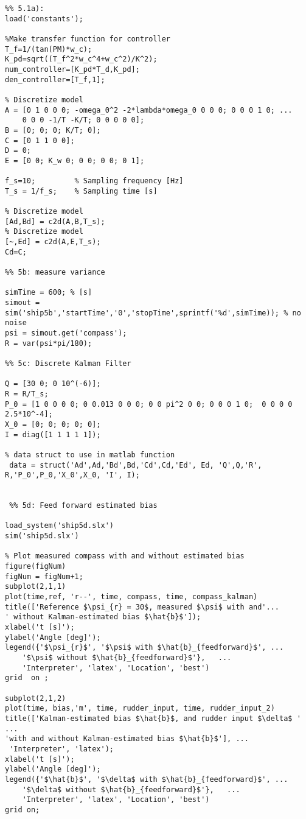 \begin{lstlisting}
%% 5.1a): 
load('constants');

%Make transfer function for controller
T_f=1/(tan(PM)*w_c);    
K_pd=sqrt((T_f^2*w_c^4+w_c^2)/K^2);
num_controller=[K_pd*T_d,K_pd];
den_controller=[T_f,1];

% Discretize model
A = [0 1 0 0 0; -omega_0^2 -2*lambda*omega_0 0 0 0; 0 0 0 1 0; ...  
    0 0 0 -1/T -K/T; 0 0 0 0 0];
B = [0; 0; 0; K/T; 0];
C = [0 1 1 0 0];
D = 0;
E = [0 0; K_w 0; 0 0; 0 0; 0 1];

f_s=10;         % Sampling frequency [Hz]
T_s = 1/f_s;    % Sampling time [s]

% Discretize model 
[Ad,Bd] = c2d(A,B,T_s);
% Discretize model 
[~,Ed] = c2d(A,E,T_s);
Cd=C;

%% 5b: measure variance 

simTime = 600; % [s]
simout = sim('ship5b','startTime','0','stopTime',sprintf('%d',simTime)); % no noise
psi = simout.get('compass'); 
R = var(psi*pi/180);    

%% 5c: Discrete Kalman Filter

Q = [30 0; 0 10^(-6)];
R = R/T_s;
P_0 = [1 0 0 0 0; 0 0.013 0 0 0; 0 0 pi^2 0 0; 0 0 0 1 0;  0 0 0 0 2.5*10^-4];
X_0 = [0; 0; 0; 0; 0];
I = diag([1 1 1 1 1]);

% data struct to use in matlab function
 data = struct('Ad',Ad,'Bd',Bd,'Cd',Cd,'Ed', Ed, 'Q',Q,'R', R,'P_0',P_0,'X_0',X_0, 'I', I);
 
 
 %% 5d: Feed forward estimated bias
 
load_system('ship5d.slx')
sim('ship5d.slx')

% Plot measured compass with and without estimated bias
figure(figNum)
figNum = figNum+1;
subplot(2,1,1)
plot(time,ref, 'r--', time, compass, time, compass_kalman)
title(['Reference $\psi_{r} = 30$, measured $\psi$ with and'...
' without Kalman-estimated bias $\hat{b}$']);
xlabel('t [s]'); 
ylabel('Angle [deg]');
legend({'$\psi_{r}$', '$\psi$ with $\hat{b}_{feedforward}$', ...
    '$\psi$ without $\hat{b}_{feedforward}$'},   ...
    'Interpreter', 'latex', 'Location', 'best')
grid  on ;

subplot(2,1,2)
plot(time, bias,'m', time, rudder_input, time, rudder_input_2)
title(['Kalman-estimated bias $\hat{b}$, and rudder input $\delta$ ' ...
'with and without Kalman-estimated bias $\hat{b}$'], ...
 'Interpreter', 'latex');
xlabel('t [s]');
ylabel('Angle [deg]');
legend({'$\hat{b}$', '$\delta$ with $\hat{b}_{feedforward}$', ...
    '$\delta$ without $\hat{b}_{feedforward}$'},   ...
    'Interpreter', 'latex', 'Location', 'best')
grid on;



\end{lstlisting}
